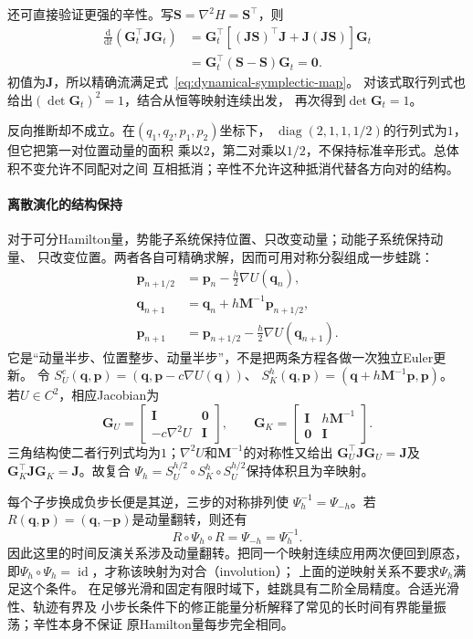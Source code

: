 还可直接验证更强的辛性。写$\bm S=\nabla^2H=\bm S^\top$，则
\[
  \begin{aligned}
    \frac{\mathrm d}{\mathrm dt}(\bm G_t^\top\bm J\bm G_t)
    &=\bm G_t^\top[(\bm J\bm S)^\top\bm J
                         +\bm J(\bm J\bm S)]\bm G_t\\
    &=\bm G_t^\top(\bm S-\bm S)\bm G_t=\bm0.
  \end{aligned}
\]
初值为$\bm J$，所以精确流满足式~\eqref{eq:dynamical-symplectic-map}。
对该式取行列式也给出$(\det\bm G_t)^2=1$，结合从恒等映射连续出发，
再次得到$\det\bm G_t=1$。

反向推断却不成立。在$(q_1,q_2,p_1,p_2)$坐标下，
$\operatorname{diag}(2,1,1,1/2)$的行列式为$1$，但它把第一对位置动量的面积
乘以$2$，第二对乘以$1/2$，不保持标准辛形式。总体积不变允许不同配对之间
互相抵消；辛性不允许这种抵消代替各方向对的结构。

\paragraph{离散演化的结构保持}
对于可分Hamilton量，势能子系统保持位置、只改变动量；动能子系统保持动量、
只改变位置。两者各自可精确求解，因而可用对称分裂组成一步蛙跳：
\begin{align}
  \bm p_{n+1/2}&=\bm p_n-\frac h2\nabla U(\bm q_n),
    \label{eq:dynamical-leapfrog-half-momentum}\\
  \bm q_{n+1}&=\bm q_n+h\bm M^{-1}\bm p_{n+1/2},
    \label{eq:dynamical-leapfrog-position}\\
  \bm p_{n+1}&=\bm p_{n+1/2}-\frac h2\nabla U(\bm q_{n+1}).
    \label{eq:dynamical-leapfrog-final-momentum}
\end{align}
它是“动量半步、位置整步、动量半步”，不是把两条方程各做一次独立Euler更新。
令
$S_U^c(\bm q,\bm p)=(\bm q,\bm p-c\nabla U(\bm q))$、
$S_K^h(\bm q,\bm p)=(\bm q+h\bm M^{-1}\bm p,\bm p)$。
若$U\in C^2$，相应Jacobian为
\[
  \bm G_U=\begin{bmatrix}\bm I&\bm0\\-c\nabla^2U&\bm I\end{bmatrix},
  \qquad
  \bm G_K=\begin{bmatrix}\bm I&h\bm M^{-1}\\\bm0&\bm I\end{bmatrix}.
\]
三角结构使二者行列式均为$1$；$\nabla^2U$和$\bm M^{-1}$的对称性又给出
$\bm G_U^\top\bm J\bm G_U=\bm J$及
$\bm G_K^\top\bm J\bm G_K=\bm J$。故复合
$\Psi_h=S_U^{h/2}\circ S_K^h\circ S_U^{h/2}$保持体积且为辛映射。

每个子步换成负步长便是其逆，三步的对称排列使
$\Psi_h^{-1}=\Psi_{-h}$。若$R(\bm q,\bm p)=(\bm q,-\bm p)$是动量翻转，则还有
\[
  R\circ\Psi_h\circ R=\Psi_{-h}=\Psi_h^{-1}.
\]
因此这里的时间反演关系涉及动量翻转。把同一个映射连续应用两次便回到原态，
即$\Psi_h\circ\Psi_h=\operatorname{id}$，才称该映射为对合（involution）；
上面的逆映射关系不要求$\Psi_h$满足这个条件。
在足够光滑和固定有限时域下，蛙跳具有二阶全局精度。合适光滑性、轨迹有界及
小步长条件下的修正能量分析解释了常见的长时间有界能量振荡；辛性本身不保证
原Hamilton量每步完全相同。

